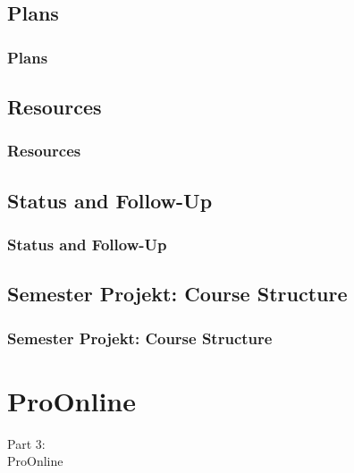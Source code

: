\documentclass[t, aspectratio=169]{beamer}
\begin{document}
\subsection{Plans}
\begin{frame}[fragile]
  \frametitle{Plans}
  \vspace{1mm}
  
\end{frame}

\subsection{Resources}
\begin{frame}[fragile]
  \frametitle{Resources}
  \vspace{1mm}
  
\end{frame}

\subsection{Status and Follow-Up}
\begin{frame}[fragile]
  \frametitle{Status and Follow-Up}
  \vspace{1mm}
  
\end{frame}

\subsection{Semester Projekt: Course Structure}
\begin{frame}[fragile]
  \frametitle{Semester Projekt: Course Structure}
  \vspace{1mm}
  
\end{frame}

\section{ProOnline}
\begin{frame}
  \vspace{25mm}
  \begin{center}
    \Huge{Part 3:\\ProOnline}
  \end{center}
\end{frame}
\end{document}
